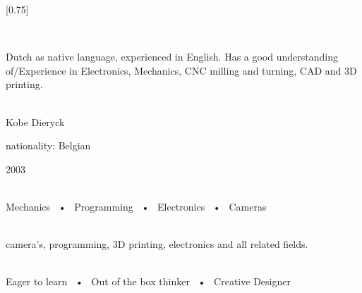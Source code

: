 \documentclass[lighthipster]{simplehipstercv}
\begin{document}
\setlength{\columnsep}{1.5cm}
[0.75]
\begin{paracol}{2}

\paracolbackgroundoptions



\footnotesize
{\setasidefontcolour
\flushright
\begin{center}
\end{center}

\\[0.5em]

{\footnotesize
Dutch as native language, experienced in English. Has a good understanding of/Experience in Electronics, Mechanics, CNC milling and turning, CAD and 3D printing.

\bigskip

 \\[0.5em]
Kobe Dieryck

nationality: Belgian 

2003

\bigskip

 \\[0.5em]

Mechanics ~•~ Programming ~•~ Electronics ~•~ Cameras

\bigskip



\bigskip

\\[0.5em]

camera's, programming, 3D printing, electronics and all related fields.
\bigskip

\\[0.5em]

Eager to learn ~•~ Out of the box thinker ~•~ Creative Designer

\vspace{4em}


}}
\end{paracol}
\end{document}
